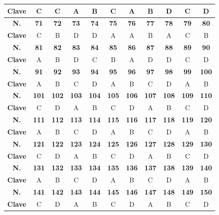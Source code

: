 \begin{center}
\begin{tabular}{|c|c|c|c|c|c|c|c|c|c|c|}
\hline
\textbf{Clave} & C & C & A & B & C & A & B & D & C & D \\
\hline
\textbf{N.} & \textbf{71} & \textbf{72} & \textbf{73} & \textbf{74} & \textbf{75} & \textbf{76} & \textbf{77} & \textbf{78} & \textbf{79} & \textbf{80} \\
\hline
\textbf{Clave} & C & B & D & D & A & A & B & A & C & B \\
\hline
\textbf{N.} & \textbf{81} & \textbf{82} & \textbf{83} & \textbf{84} & \textbf{85} & \textbf{86} & \textbf{87} & \textbf{88} & \textbf{89} & \textbf{90} \\
\hline
\textbf{Clave} & A & B & D & C & B & A & D & D & C & D \\
\hline
\textbf{N.} & \textbf{91} & \textbf{92} & \textbf{93} & \textbf{94} & \textbf{95} & \textbf{96} & \textbf{97} & \textbf{98} & \textbf{99} & \textbf{100} \\
\hline
\textbf{Clave} & A & B & C & D & A & B & C & D & A & B \\
\hline
\textbf{N.} & \textbf{101} & \textbf{102} & \textbf{103} & \textbf{104} & \textbf{105} & \textbf{106} & \textbf{107} & \textbf{108} & \textbf{109} & \textbf{110} \\
\hline
\textbf{Clave} & C & D & A & B & C & D & A & B & C & D \\
\hline
\textbf{N.} & \textbf{111} & \textbf{112} & \textbf{113} & \textbf{114} & \textbf{115} & \textbf{116} & \textbf{117} & \textbf{118} & \textbf{119} & \textbf{120} \\
\hline
\textbf{Clave} & A & B & C & D & A & B & C & D & A & B \\
\hline
\textbf{N.} & \textbf{121} & \textbf{122} & \textbf{123} & \textbf{124} & \textbf{125} & \textbf{126} & \textbf{127} & \textbf{128} & \textbf{129} & \textbf{130} \\
\hline
\textbf{Clave} & C & D & A & B & C & D & A & B & C & D \\
\hline
\textbf{N.} & \textbf{131} & \textbf{132} & \textbf{133} & \textbf{134} & \textbf{135} & \textbf{136} & \textbf{137} & \textbf{138} & \textbf{139} & \textbf{140} \\
\hline
\textbf{Clave} & A & B & C & D & A & B & C & D & A & B \\
\hline
\textbf{N.} & \textbf{141} & \textbf{142} & \textbf{143} & \textbf{144} & \textbf{145} & \textbf{146} & \textbf{147} & \textbf{148} & \textbf{149} & \textbf{150} \\
\hline
\textbf{Clave} & C & D & A & B & C & D & A & B & C & D \\

\end{tabular}
\end{center}
